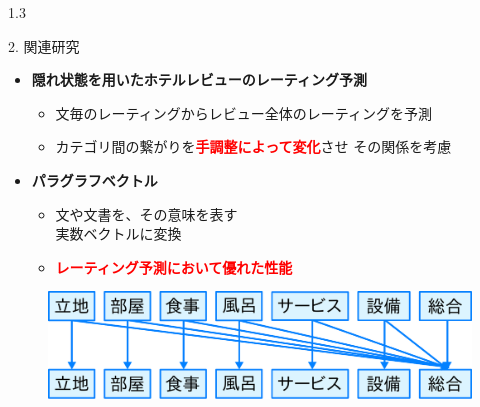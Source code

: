 \documentclass[unicode,10pt]{beamer}
\newlength{\mycolumnwidth}
\newcommand{\itemtitle}[1]{\textbf{#1}\\}
\newcommand{\fire}[1]{\textcolor{red}{\textbf{#1}}}
\newcommand{\doublecolumns}[4]{
    \begin{minipage}[t]{#1}
      #2
    \end{minipage}
    \begin{minipage}[t]{#3}
      #4
    \end{minipage}}
\begin{document}
\begin{frame}
\begin{columns}[onlytextwidth,t]
  \begin{column}{1.3\mycolumnwidth}
    \begin{block}{2. 関連研究}
      \doublecolumns{0.525\textwidth}{
        \begin{itemize}
          \item \itemtitle{隠れ状態を用いたホテルレビューのレーティング予測
                           \cite{fujitani15}}
            \begin{itemize}
              \item 文毎のレーティングからレビュー全体のレーティングを予測
              \item カテゴリ間の繋がりを\fire{手調整によって変化}させ
                    その関係を考慮
            \end{itemize}
          \item \itemtitle{パラグラフベクトル\cite{quoc14}}
            \begin{itemize}
              \item 文や文書を、その意味を表す\\実数ベクトルに変換
              \item \fire{レーティング予測において優れた性能}
            \end{itemize}
        \end{itemize}
      }{0.45\textwidth}{
        \begin{figure}
          \includegraphics[width=\linewidth]
              {fig/fujitani_miml_relations_among_rating_categories.pdf}
        \end{figure}
        \begin{figure}

\end{figure}}
\end{block}
\end{column}
\end{columns}
\end{frame}
\end{document}
